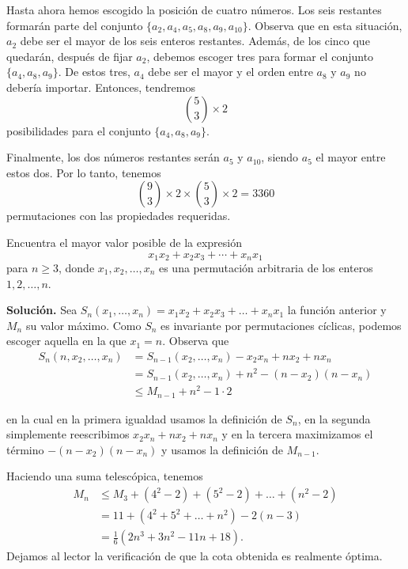 \documentclass[11pt]{scrartcl}
\begin{document}
Hasta ahora hemos escogido la posición de cuatro números. Los seis restantes formarán parte del conjunto $\{a_2, a_4, a_5, a_8, a_9, a_{10}\}$. Observa que en esta situación, $a_2$ debe ser el mayor de los seis enteros restantes. Además, de los cinco que quedarán, después de fijar $a_2$, debemos escoger tres para formar el conjunto $\{a_4, a_8, a_9\}$. De estos tres, $a_4$ debe ser el mayor y el orden entre $a_8$ y $a_9$ no debería importar. Entonces, tendremos 
\[
\binom{5}{3} \times 2
\]
posibilidades para el conjunto $\{a_4, a_8, a_9\}$.

Finalmente, los dos números restantes serán $a_5$ y $a_{10}$, siendo $a_5$ el mayor entre estos dos. Por lo tanto, tenemos
\[
\binom{9}{3} \times 2 \times \binom{5}{3} \times 2 = 3360
\]
permutaciones con las propiedades requeridas.

\begin{example}
Encuentra el mayor valor posible de la expresión
\[
x_1x_2 + x_2x_3 + \cdots + x_nx_1
\]
para $n \geq 3$, donde $x_1, x_2, \dots, x_n$ es una permutación arbitraria de los enteros $1, 2, \dots, n$.
\end{example}
\textbf{Solución.} Sea $S_n(x_1, \dots, x_n) = x_1x_2 + x_2x_3 + \dots + x_nx_1$ la función anterior y $M_n$ su valor máximo. Como $S_n$ es invariante por permutaciones cíclicas, podemos escoger aquella en la que $x_1 = n$. Observa que
\begin{align*}
S_n(n, x_2, \dots, x_n) &= S_{n-1}(x_2, \dots, x_n) - x_2x_n + nx_2 + nx_n \\
&= S_{n-1}(x_2, \dots, x_n) + n^2 - (n - x_2)(n - x_n)\\
&\leq M_{n-1} + n^2 - 1 \cdot 2
\end{align*}

en la cual en la primera igualdad usamos la definición de $S_n$, en la segunda simplemente reescribimos $x_2x_n + nx_2 + nx_n$ y en la tercera maximizamos el término $-(n - x_2)(n - x_n)$ y usamos la definición de $M_{n-1}$.

Haciendo una suma telescópica, tenemos
\begin{align*}
M_n &\leq M_3 + (4^2 - 2) + (5^2 - 2) + \dots + (n^2 - 2) \\&= 11 + (4^2 + 5^2 + \dots + n^2) - 2(n - 3) \\&= \frac{1}{6}(2n^3 + 3n^2 - 11n + 18).
\end{align*}
Dejamos al lector la verificación de que la cota obtenida es realmente óptima.
\end{document}
